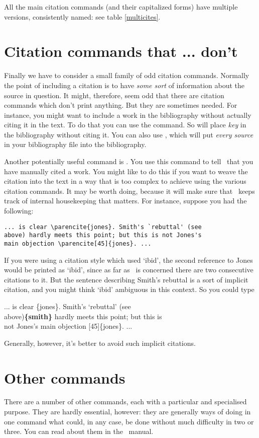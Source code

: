 All the main citation commands (and their capitalized forms) have
multiple versions, consistently named: see table \ref{multicites}.

\section{Citation commands that ... don't}

Finally we have to consider a small family of odd citation
commands. Normally the point of including a citation is to have
\emph{some sort} of information about the source in question. It
might, therefore, seem odd that there are citation commands which
don't print anything. But they are sometimes needed. For instance, you
might want to include a work in the bibliography without actually
citing it in the text. To do that you can use the 
command. So  will place \emph{key} in the
bibliography without citing it. You can also use ,
which will put \emph{every source} in your bibliography file into the
bibliography.

Another potentially useful command is . You use this
command to tell \biblatex\ that you have manually cited a work. You
might like to do this if you want to weave the citation into the text
in a way that is too complex to achieve using the various citation
commands. It may be worth doing, because it will make sure that
\biblatex\ keeps track of internal housekeeping that matters. For
instance, suppose you had the following:
\begin{verbatim}
... is clear \parencite{jones}. Smith's `rebuttal' (see 
above) hardly meets this point; but this is not Jones's 
main objection \parencite[45]{jones}. ...
\end{verbatim}
If you were using a citation style which used `ibid', the second
reference to Jones would be printed as `ibid', since as far as
\biblatex\ is concerned there are two consecutive citations to it. But
the sentence describing Smith's rebuttal is a sort of implicit
citation, and you might think `ibid' ambiguous in this context. So you
could type
\begin{pseudoverb}
... is clear \{jones\}. Smith's `rebuttal' (see\\
above){\bfseries{}\{smith\}} hardly meets this point; but this is\\
not Jones's main objection [45]\{jones\}. ...
\end{pseudoverb}
Generally, however, it's better to avoid such implicit citations.

\section{Other commands}

There are a number of other commands, each with a particular and
specialised purpose. They are hardly essential, however: they are
generally ways of doing in one command what could, in any case, be
done without much difficulty in two or three. You can read about them
in the \biblatex\ manual.